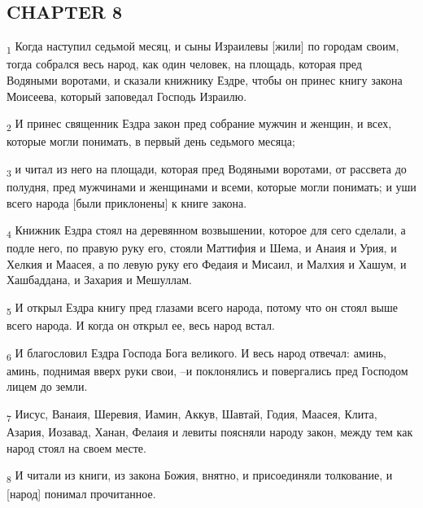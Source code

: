 \subsection{CHAPTER 8}
\begin{tcolorbox}
\textsubscript{1} Когда наступил седьмой месяц, и сыны Израилевы [жили] по городам своим, тогда собрался весь народ, как один человек, на площадь, которая пред Водяными воротами, и сказали книжнику Ездре, чтобы он принес книгу закона Моисеева, который заповедал Господь Израилю.
\end{tcolorbox}
\begin{tcolorbox}
\textsubscript{2} И принес священник Ездра закон пред собрание мужчин и женщин, и всех, которые могли понимать, в первый день седьмого месяца;
\end{tcolorbox}
\begin{tcolorbox}
\textsubscript{3} и читал из него на площади, которая пред Водяными воротами, от рассвета до полудня, пред мужчинами и женщинами и всеми, которые могли понимать; и уши всего народа [были приклонены] к книге закона.
\end{tcolorbox}
\begin{tcolorbox}
\textsubscript{4} Книжник Ездра стоял на деревянном возвышении, которое для сего сделали, а подле него, по правую руку его, стояли Маттифия и Шема, и Анаия и Урия, и Хелкия и Маасея, а по левую руку его Федаия и Мисаил, и Малхия и Хашум, и Хашбаддана, и Захария и Мешуллам.
\end{tcolorbox}
\begin{tcolorbox}
\textsubscript{5} И открыл Ездра книгу пред глазами всего народа, потому что он стоял выше всего народа. И когда он открыл ее, весь народ встал.
\end{tcolorbox}
\begin{tcolorbox}
\textsubscript{6} И благословил Ездра Господа Бога великого. И весь народ отвечал: аминь, аминь, поднимая вверх руки свои, --и поклонялись и повергались пред Господом лицем до земли.
\end{tcolorbox}
\begin{tcolorbox}
\textsubscript{7} Иисус, Ванаия, Шеревия, Иамин, Аккув, Шавтай, Годия, Маасея, Клита, Азария, Иозавад, Ханан, Фелаия и левиты поясняли народу закон, между тем как народ стоял на своем месте.
\end{tcolorbox}
\begin{tcolorbox}
\textsubscript{8} И читали из книги, из закона Божия, внятно, и присоединяли толкование, и [народ] понимал прочитанное.
\end{tcolorbox}
